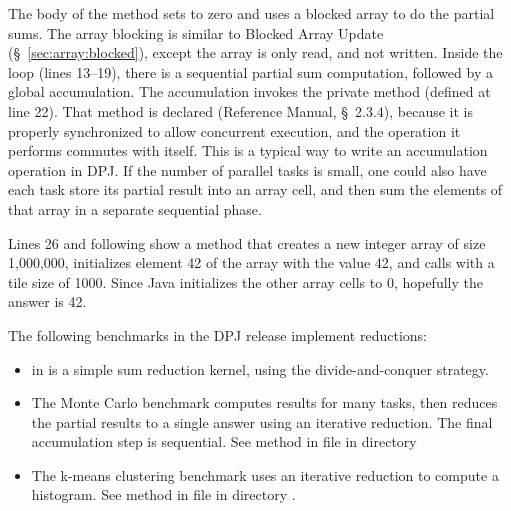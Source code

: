 The body of the  method sets  to zero and uses a
blocked array to do the partial sums.  The array blocking is similar
to Blocked Array Update (\S~\ref{sec:array:blocked}), except the array
is only read, and not written.  Inside the  loop (lines
13--19), there is a sequential partial sum computation, followed by a
global accumulation.  The accumulation invokes the private method
 (defined at line 22).  That method is declared
 (Reference Manual, \S~2.3.4), because it is properly
synchronized to allow concurrent execution, and the operation it
performs commutes with itself.  This is a typical way to write an
accumulation operation in DPJ.  If the number of parallel tasks is
small, one could also have each task store its partial result into an
array cell, and then sum the elements of that array in a separate
sequential phase.

Lines 26 and following show a  method that creates a new
integer array of size 1,000,000, initializes element 42 of the array
with the value 42, and calls  with a tile size of 1000.
Since Java initializes the other array cells to 0, hopefully the
answer is 42.

 The following benchmarks in the DPJ release
implement reductions:
%
\begin{itemize}
%
\item {} in  is a simple
  sum reduction kernel, using the divide-and-conquer strategy.
%
\item The Monte Carlo benchmark computes results for many tasks, then
  reduces the partial results to a single answer using an iterative
  reduction.  The final accumulation step is sequential.  See method
   in file  in directory
%
\item The k-means clustering benchmark uses an iterative reduction to
  compute a histogram.  See method  in file
   in directory
  .
%
\end{itemize}
